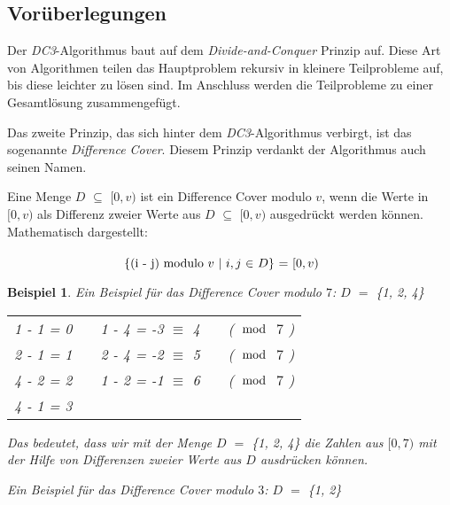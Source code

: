 \subsection{Vorüberlegungen}
\label{dc3:vorueberlegungen}

\newtheorem{example}{Beispiel}
Der \emph{DC3}-Algorithmus baut auf dem \emph{Divide-and-Conquer} Prinzip auf. Diese Art von Algorithmen teilen das Hauptproblem rekursiv in kleinere Teilprobleme auf, bis diese leichter zu lösen sind. Im Anschluss werden die Teilprobleme zu einer Gesamtlösung zusammengefügt.

Das zweite Prinzip, das sich hinter dem \emph{DC3}-Algorithmus verbirgt, ist das sogenannte \emph{Difference Cover}. Diesem Prinzip verdankt der Algorithmus auch seinen Namen.

\begin{definition}
	\label{def:differenceCover}
	Eine Menge \(D\) $\subseteq$ \([0,v)\) ist ein Difference Cover modulo \(v\), wenn die Werte in \([0,v)\) als Differenz zweier Werte aus \(D\) $\subseteq$ \([0,v)\) ausgedrückt werden können. Mathematisch dargestellt:\\ \\
	$\makebox[\linewidth]{\{(i - j) \text{modulo} \(v\) $\mid$ $i,j$ $\in$ \(D\)\} $=$ \([0,v)\)}$\\
			
\end{definition}

\begin{example}
	Ein Beispiel für das Difference Cover \emph{modulo} \(7\): \(D\) $=$ \{1, 2, 4\} 
	\begin{table}[!htbp]
		\centering
		\begin{tabular}{lllll}
			1 - 1 = 0 &  & 1 - 4 = -3 $\equiv$ 4 &  & (\(\mod\) \(7\) )\\
			2 - 1 = 1 &  & 2 - 4 = -2 $\equiv$ 5 &  & (\(\mod\) \(7\) )\\
			4 - 2 = 2 &  & 1 - 2 = -1 $\equiv$ 6 &  & (\(\mod\) \(7\) )\\
			4 - 1 = 3 &  &                       &  & 
		\end{tabular}
	\end{table}
	
	Das bedeutet, dass wir mit der Menge \(D\) $=$ \{1, 2, 4\} die Zahlen aus \([0,7)\) mit der Hilfe von Differenzen zweier Werte aus \(D\) ausdrücken können.
	
	Ein Beispiel für das Difference Cover \emph{modulo} \(3\): \(D\) $=$ \{1, 2\} 
\end{example}
